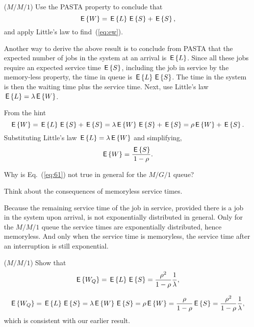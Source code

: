 \begin{exercise}($M/M/1$) Use the PASTA property to conclude that
\begin{equation}\label{eq:61}
  \,\mathsf{E}\left\{W\right\} = \,\mathsf{E}\left\{L\right\}  \,\mathsf{E}\left\{S\right\} + \,\mathsf{E}\left\{S\right\},
\end{equation}
and apply Little's law to find~(\ref{eq:ew}). 
\begin{hint}
Another way to derive the above result is to conclude from PASTA that
the expected number of jobs in the system at an arrival is $\,\mathsf{E}\left\{L\right\}$.
Since all these jobs require an expected service time $\,\mathsf{E}\left\{S\right\}$,
including the job in service by the memory-less property, the time in
queue is $\,\mathsf{E}\left\{L\right\} \,\mathsf{E}\left\{S\right\}$. The time in the system is then the waiting time
plus the service time. Next, use Little's law $\,\mathsf{E}\left\{L\right\} = \lambda \,\mathsf{E}\left\{W\right\}$.
\end{hint}
\begin{solution}
From the hint
\begin{equation}
  \,\mathsf{E}\left\{W\right\} = \,\mathsf{E}\left\{L\right\}  \,\mathsf{E}\left\{S\right\} + \,\mathsf{E}\left\{S\right\} = \lambda \,\mathsf{E}\left\{W\right\} \,\mathsf{E}\left\{S\right\} + \,\mathsf{E}\left\{S\right\} = \rho \,\mathsf{E}\left\{W\right\}  + \,\mathsf{E}\left\{S\right\}.
\end{equation}
Substituting Little's law $\,\mathsf{E}\left\{L\right\} = \lambda \,\mathsf{E}\left\{W\right\}$ and simplifying,
\begin{equation*}
\,\mathsf{E}\left\{W\right\} = \frac{\,\mathsf{E}\left\{S\right\}}{1-\rho}.
\end{equation*}
\end{solution}
\end{exercise}


\begin{exercise}
  Why is Eq.~(\ref{eq:61}) not true in general for the $M/G/1$ queue?
  \begin{hint}
Think about the consequences of memoryless service times.
  \end{hint}
  \begin{solution}
    Because the remaining service time of the job in service, provided
    there is a job in the system upon arrival, is not exponentially
    distributed in general. Only for the $M/M/1$ queue the service
    times are exponentially distributed, hence memoryless. And only
    when the service time is memoryless, the service time after an
    interruption is still exponential.
  \end{solution}
\end{exercise}

\begin{exercise}($M/M/1$)
Show that 
\begin{equation}\label{eq:wqes}
  \,\mathsf{E}\left\{W_Q\right\} = \,\mathsf{E}\left\{L\right\} \,\mathsf{E}\left\{S\right\} = \frac{\rho^2}{1-\rho} \frac 1 \lambda,
\end{equation}
  \begin{solution}
\begin{equation}
  \,\mathsf{E}\left\{W_Q\right\} = \,\mathsf{E}\left\{L\right\} \,\mathsf{E}\left\{S\right\} = \lambda \,\mathsf{E}\left\{W\right\} \,\mathsf{E}\left\{S\right\}= \rho \,\mathsf{E}\left\{W\right\} = \frac{\rho}{1-\rho} \,\mathsf{E}\left\{S\right\} = \frac{\rho^2}{1-\rho} \frac 1 \lambda,
\end{equation}
which is consistent with our earlier result.  
  \end{solution}
\end{exercise}

